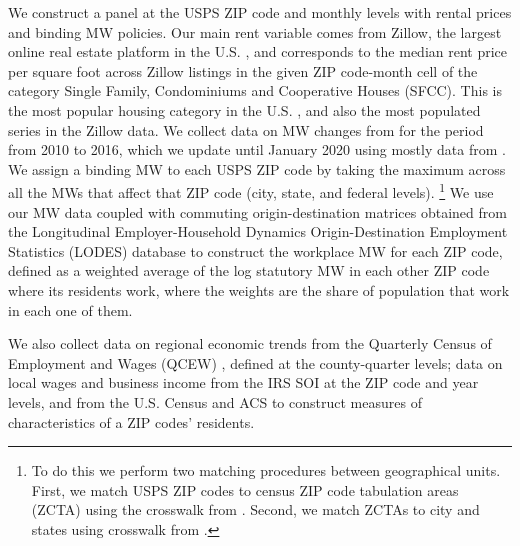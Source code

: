 We construct a panel at the USPS ZIP code and monthly levels with rental prices 
and binding MW policies.
Our main rent variable comes from Zillow, the largest online real estate platform 
in the U.S. \parencite{realestateagentpdx, investopedia}, and corresponds to the 
median rent price per square foot across Zillow listings in the given ZIP code-month 
cell of the category Single Family, Condominiums and Cooperative Houses (SFCC). 
This is the most popular housing category in the U.S. \parencite{fernald2020americas}, 
and also the most populated series in the Zillow data.
We collect data on MW changes from \textcite{VaghulZipperer2016} for the 
period from 2010 to 2016, which we update until January 2020 using mostly data from
\textcite{BerkeleyLaborCenter}.
We assign a binding MW to each USPS ZIP code by taking the maximum across all the
MWs that affect that ZIP code (city, state, and federal levels).%
\footnote{To do this we perform two matching procedures between geographical units.
First, we match USPS ZIP codes to census ZIP code tabulation areas (ZCTA) using 
the crosswalk from \textcite{UDSMapper}. %
Second, we match ZCTAs to city and states using crosswalk from \textcite{Missouri}.}
We use our MW data coupled with commuting origin-destination matrices obtained from 
the Longitudinal Employer-Household Dynamics Origin-Destination Employment 
Statistics (LODES) \textcite{lodes} database to construct the workplace MW for each ZIP code,
defined as a weighted average of the log statutory MW in each other ZIP code where 
its residents work, where the weights are the share of population that work in each 
one of them.

We also collect data on regional economic trends from the Quarterly Census of 
Employment and Wages (QCEW) \textcite{qcew}, defined at the county-quarter levels;
data on local wages and business income from the IRS SOI \textcite{irs}
at the ZIP code and year levels, and from the U.S. Census and ACS to 
construct measures of characteristics of a ZIP codes' residents.


